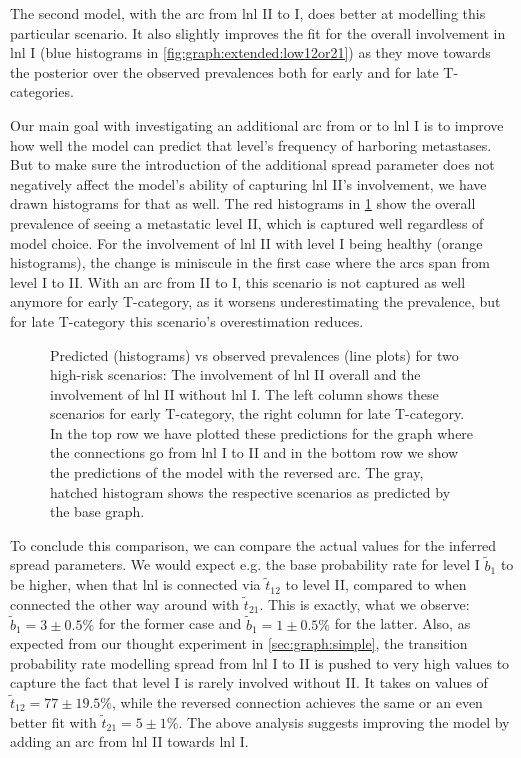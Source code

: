 \documentclass[\relativeRoot/main.tex]{subfiles}
\begin{document}
The second model, with the arc from \gls{lnl} II to I, does better at modelling this particular scenario. It also slightly improves the fit for the overall involvement in \gls{lnl} I (blue histograms in \cref{fig:graph:extended:low12or21}) as they move towards the posterior over the observed prevalences both for early and for late T-categories.

Our main goal with investigating an additional arc from or to \gls{lnl} I is to improve how well the model can predict that level's frequency of harboring metastases. But to make sure the introduction of the additional spread parameter does not negatively affect the model's ability of capturing \gls{lnl} II's involvement, we have drawn histograms for that as well. The red histograms in \cref{fig:graph:extended:high12or21} show the overall prevalence of seeing a metastatic level II, which is captured well regardless of model choice. For the involvement of \gls{lnl} II with level I being healthy (orange histograms), the change is miniscule in the first case where the arcs span from level I to II. With an arc from II to I, this scenario is not captured as well anymore for early T-category, as it worsens underestimating the prevalence, but for late T-category this scenario's overestimation reduces.

\begin{figure}
    \centering
    \def\svgwidth{1.0\textwidth}
    
    \caption[
        Comparison of prevalences of high-risk scenarios for the two directions of the arc between LNL I and II
    ]{
        Predicted (histograms) vs observed prevalences (line plots) for two high-risk scenarios: The involvement of \gls{lnl} II overall and the involvement of \gls{lnl} II without \gls{lnl} I. The left column shows these scenarios for early T-category, the right column for late T-category. In the top row we have plotted these predictions for the graph where the connections go from \gls{lnl} I to II and in the bottom row we show the predictions of the model with the reversed arc. The gray, hatched histogram shows the respective scenarios as predicted by the base graph.
    }
    \label{fig:graph:extended:high12or21}
\end{figure}

To conclude this comparison, we can compare the actual values for the inferred spread parameters. We would expect e.g. the base probability rate for level I $\tilde{b}_1$ to be higher, when that \gls{lnl} is connected via $\tilde{t}_{12}$ to level II, compared to when connected the other way around with $\tilde{t}_{21}$. This is exactly, what we observe: $\tilde{b}_1 = 3 \pm 0.5 \%$ for the former case and $\tilde{b}_1 = 1 \pm 0.5 \%$ for the latter. Also, as expected from our thought experiment in \cref{sec:graph:simple}, the transition probability rate modelling spread from \gls{lnl} I to II is pushed to very high values to capture the fact that level I is rarely involved without II. It takes on values of $\tilde{t}_{12} = 77 \pm 19.5 \%$, while the reversed connection achieves the same or an even better fit with $\tilde{t}_{21} = 5 \pm 1 \%$. The above analysis suggests improving the model by adding an arc from \gls{lnl} II towards \gls{lnl} I.
\end{document}
